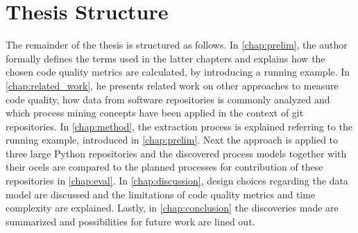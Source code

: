 \section{Thesis Structure}
\label{sec:intro_ssec:ts}
The remainder of the thesis is structured as follows. In \cref{chap:prelim}, the author formally defines the terms used in the latter chapters and explains how the chosen code quality metrics are calculated, by introducing a running example. In \cref{chap:related_work}, he presents related work on other approaches to measure code quality, how data from software repositories is commonly analyzed and which process mining concepts have been applied in the context of git repositories. In \cref{chap:method}, the extraction process is explained referring to the running example, introduced in \cref{chap:prelim}. Next the approach is applied to three large Python repositories and the discovered process models together with their \acp{ocel} are compared to the planned processes for contribution of these repositories in \cref{chap:eval}. In \cref{chap:discussion}, design choices regarding the data model are discussed and the limitations of code quality metrics and time complexity are explained. Lastly, in \cref{chap:conclusion} the discoveries made are summarized and possibilities for future work are lined out.